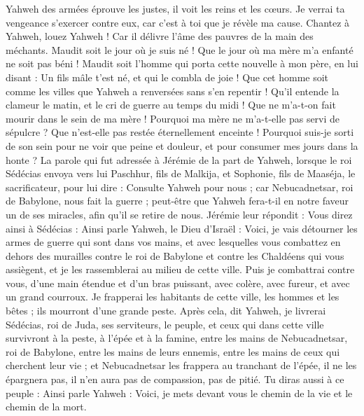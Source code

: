 \begin{multicols}{2}
Yahweh des armées éprouve les justes, il voit les reins et les cœurs. Je verrai ta vengeance s’exercer contre eux, car c’est à toi que je révèle ma cause.
Chantez à Yahweh, louez Yahweh ! Car il délivre l'âme des pauvres de la main des méchants.
Maudit soit le jour où je suis né ! Que le jour où ma mère m'a enfanté ne soit pas béni !
Maudit soit l'homme qui porta cette nouvelle à mon père, en lui disant : Un fils mâle t'est né, et qui le combla de joie !
Que cet homme soit comme les villes que Yahweh a renversées sans s'en repentir ! Qu'il entende la clameur le matin, et le cri de guerre au temps du midi !
Que ne m’a-t-on fait mourir dans le sein de ma mère ! Pourquoi ma mère ne m’a-t-elle pas servi de sépulcre ? Que n’est-elle pas restée éternellement enceinte !
Pourquoi suis-je sorti de son sein pour ne voir que peine et douleur, et pour consumer mes jours dans la honte ?
\VerseOne{}La parole qui fut adressée à Jérémie de la part de Yahweh, lorsque le roi Sédécias envoya vers lui Paschhur, fils de Malkija, et Sophonie, fils de Maaséja, le sacrificateur, pour lui dire :
Consulte Yahweh pour nous ; car Nebucadnetsar, roi de Babylone, nous fait la guerre ; peut-être que Yahweh fera-t-il en notre faveur un de ses miracles, afin qu’il se retire de nous.
Jérémie leur répondit : Vous direz ainsi à Sédécias :
Ainsi parle Yahweh, le Dieu d'Israël : Voici, je vais détourner les armes de guerre qui sont dans vos mains, et avec lesquelles vous combattez en dehors des murailles contre le roi de Babylone et contre les Chaldéens qui vous assiègent, et je les rassemblerai au milieu de cette ville.
Puis je combattrai contre vous, d’une main étendue et d’un bras puissant, avec colère, avec fureur, et avec un grand courroux.
Je frapperai les habitants de cette ville, les hommes et les bêtes ; ils mourront d'une grande peste.
Après cela, dit Yahweh, je livrerai Sédécias, roi de Juda, ses serviteurs, le peuple, et ceux qui dans cette ville survivront à la peste, à l'épée et à la famine, entre les mains de Nebucadnetsar, roi de Babylone, entre les mains de leurs ennemis, entre les mains de ceux qui cherchent leur vie ; et Nebucadnetsar les frappera au tranchant de l'épée, il ne les épargnera pas, il n'en aura pas de compassion, pas de pitié.
Tu diras aussi à ce peuple : Ainsi parle Yahweh : Voici, je mets devant vous le chemin de la vie et le chemin de la mort.

\end{multicols}

